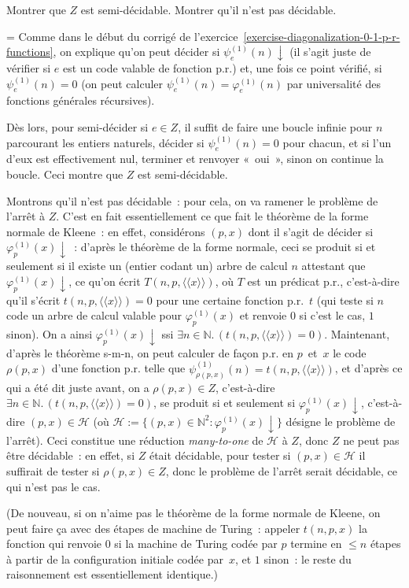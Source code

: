 \documentclass[12pt,a4paper]{article}
\theoremstyle{definition}
\newcommand{\dbllangle}{\mathopen{\langle\!\langle}}
\newcommand{\dblrangle}{\mathclose{\rangle\!\rangle}}
\newif\ifcorrige
\newenvironment{corrige}%
{\ifcorrige\relax\else\setbox0=\vbox\bgroup\fi%
\smallbreak\footnotesize\noindent{\underbar{\textit{Corrigé.}}\quad}}
{{\hbox{}\nobreak\hfill\checkmark}%
\ifcorrige\relax\else\egroup\fi\par}
\begin{document}
Montrer que $Z$ est semi-décidable.  Montrer qu'il n'est pas
décidable.

\begin{corrige}
Comme dans le début du corrigé de
l'exercice \ref{exercise-diagonalization-0-1-p-r-functions}, on
explique qu'on peut décider si $\psi^{(1)}_e(n)\downarrow$ (il s'agit
juste de vérifier si $e$ est un code valable de fonction p.r.) et, une
fois ce point vérifié, si $\psi^{(1)}_e(n) = 0$ (on peut calculer
$\psi^{(1)}_e(n) = \varphi^{(1)}_e(n)$ par universalité des fonctions
générales récursives).

Dès lors, pour semi-décider si $e \in Z$, il suffit de faire une
boucle infinie pour $n$ parcourant les entiers naturels, décider si
$\psi^{(1)}_e(n) = 0$ pour chacun, et si l'un d'eux est effectivement
nul, terminer et renvoyer « oui », sinon on continue la boucle.  Ceci
montre que $Z$ est semi-décidable.

Montrons qu'il n'est pas décidable : pour cela, on va ramener le
problème de l'arrêt à $Z$.  C'est en fait essentiellement ce que fait
le théorème de la forme normale de Kleene : en effet, considérons
$(p,x)$ dont il s'agit de décider si $\varphi^{(1)}_p(x)\downarrow$ :
d'après le théorème de la forme normale, ceci se produit si et
seulement si il existe un (entier codant un) arbre de calcul $n$
attestant que $\varphi^{(1)}_p(x)\downarrow$, ce qu'on écrit
$T(n,p,\dbllangle x\dblrangle)$, où $T$ est un prédicat p.r.,
c'est-à-dire qu'il s'écrit $t(n,p,\dbllangle x\dblrangle) = 0$ pour
une certaine fonction p.r. $t$ (qui teste si $n$ code un arbre de
calcul valable pour $\varphi^{(1)}_p(x)$ et renvoie $0$ si c'est le
cas, $1$ sinon).  On a ainsi $\varphi^{(1)}_p(x)\downarrow$ ssi
$\exists n\in\mathbb{N}.\, (t(n,p,\dbllangle x\dblrangle) = 0)$.
Maintenant, d'après le théorème s-m-n, on peut calculer de façon
p.r. en $p$ et $x$ le code $\rho(p,x)$ d'une fonction p.r. telle que
$\psi^{(1)}_{\rho(p,x)}(n) = t(n,p,\dbllangle x\dblrangle)$, et
d'après ce qui a été dit juste avant, on a $\rho(p,x) \in Z$,
c'est-à-dire $\exists n\in\mathbb{N}.\, (t(n,p,\dbllangle x\dblrangle)
= 0)$, se produit si et seulement si $\varphi^{(1)}_p(x)\downarrow$,
c'est-à-dire $(p,x) \in \mathscr{H}$ (où $\mathscr{H} := \{(p,x) \in
\mathbb{N}^2 : \varphi^{(1)}_p(x)\downarrow\}$ désigne le problème de
l'arrêt).  Ceci constitue une réduction \textit{many-to-one} de
$\mathscr{H}$ à $Z$, donc $Z$ ne peut pas être décidable : en effet,
si $Z$ était décidable, pour tester si $(p,x) \in \mathscr{H}$ il
suffirait de tester si $\rho(p,x) \in Z$, donc le problème de l'arrêt
serait décidable, ce qui n'est pas le cas.

(De nouveau, si on n'aime pas le théorème de la forme normale de
Kleene, on peut faire ça avec des étapes de machine de Turing :
appeler $t(n,p,x)$ la fonction qui renvoie $0$ si la machine de Turing
codée par $p$ termine en $\leq n$ étapes à partir de la configuration
initiale codée par $x$, et $1$ sinon : le reste du raisonnement est
essentiellement identique.)
\end{corrige}
\end{document}
